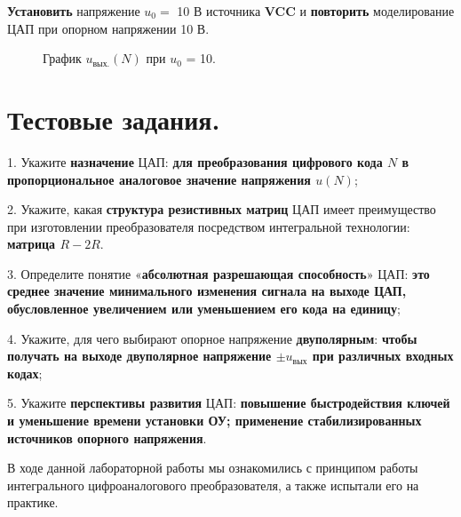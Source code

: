 \documentclass[spec, och, otchet, hidelinks]{SCWorks}
\begin{document}
\textbf{Установить} напряжение $ u_0 = $ 10 В источника \textbf{VCC} и \textbf{повторить} моделирование ЦАП при опорном напряжении 10 В. 

\begin{figure}[h!]
	\caption{График $u_\text{вых.}(N)$ при $u_0$ = 10.}
\end{figure}

\newpage

\section*{Тестовые задания.}

\par 1. Укажите \textbf{назначение} ЦАП: \textbf{для преобразования цифрового кода $N$ в пропорциональное аналоговое значение напряжения $u(N)$};

\par 2. Укажите, какая \textbf{структура резистивных матриц} ЦАП имеет преимущество при изготовлении преобразователя посредством интегральной технологии: 
\textbf{матрица $R - 2R$}.

\par 3. Определите понятие «\textbf{абсолютная разрешающая способность}» ЦАП: \textbf{это среднее значение минимального изменения сигнала на выходе ЦАП, 
обусловленное увеличением или уменьшением его кода на единицу};

\par 4. Укажите, для чего выбирают опорное напряжение \textbf{двуполярным}: \textbf{чтобы получать на выходе двуполярное напряжение $\pm u_\text{вых}$ при 
различных входных кодах};

\par 5. Укажите \textbf{перспективы развития} ЦАП: \textbf{повышение быстродействия ключей и уменьшение времени установки ОУ; применение стабилизированных источников опорного напряжения}.

\conclusion

В ходе данной лабораторной работы мы ознакомились с принципом работы интегрального цифроаналогового преобразователя, а также испытали его на практике.
\end{document}
